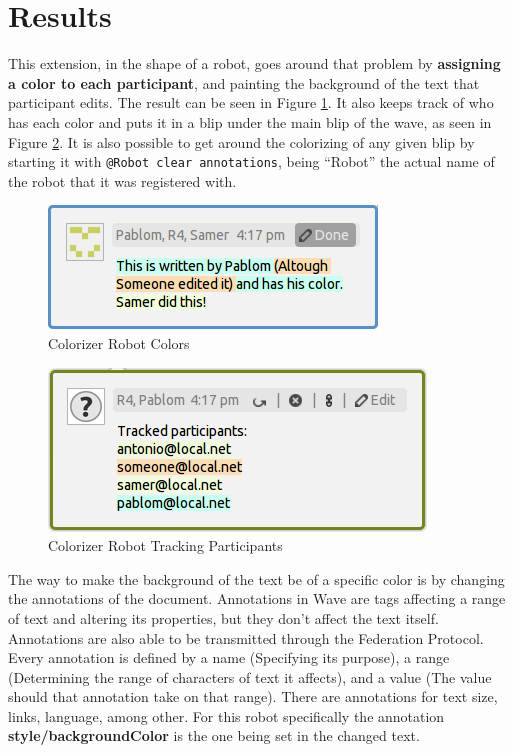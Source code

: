 \section{Results}
This extension, in the shape of a robot, goes around that problem by \textbf{assigning a color to each participant}, and painting the background of the text that participant edits. The result can be seen in Figure \ref{fig:colorizer_editions}. It also keeps track of who has each color and puts it in a blip under the main blip of the wave, as seen in Figure \ref{fig:colorizer_editors}. It is also possible to get around the colorizing of any given blip by starting it with \verb|@Robot clear annotations|, being ``Robot'' the actual name of the robot that it was registered with.\\[.2cm]
\begin{figure}[H]
  \center
    \includegraphics[keepaspectratio, scale=0.8]{Media/Captures/Extensions/Colorizer/ColorizerEditions.png}
  \caption{Colorizer Robot Colors}
  \label{fig:colorizer_editions}
\end{figure}
\begin{figure}[H]
  \center
    \includegraphics[keepaspectratio, scale=0.7]{Media/Captures/Extensions/Colorizer/ColorizerEditors.png}
  \caption{Colorizer Robot Tracking Participants}
  \label{fig:colorizer_editors}
\end{figure}
The way to make the background of the text be of a specific color is by changing the annotations of the document. Annotations in Wave are tags affecting a range of text and altering its properties, but they don't affect the text itself. Annotations are also able to be transmitted through the Federation Protocol. Every annotation is defined by a name (Specifying its purpose), a range (Determining the range of characters of text it affects), and a value (The value should that annotation take on that range). There are annotations for text size, links, language, among other. For this robot specifically the annotation \textbf{style/backgroundColor} is the one being set in the changed text.\\[.2cm]
